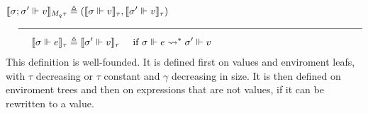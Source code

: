 \begin{definition}
\begin{equation}
\begin{aligned}[c]
  \llbracket \sigma; \sigma' \Vdash v \rrbracket_{M_q \tau} &\triangleq
    (\llbracket \sigma \Vdash v \rrbracket_{\tau}, \llbracket \sigma' \Vdash v
    \rrbracket_{\tau}) \\
  \rule{5em}{0.4pt}&\rule{30em}{0.4pt}\\
  \llbracket \sigma \Vdash e \rrbracket_{\tau} &\triangleq \llbracket \sigma'
    \Vdash v\rrbracket_{\tau} \quad{\text{ if } \sigma \Vdash e
    \rightsquigarrow^* \sigma' \Vdash v}
  \end{aligned}
  \end{equation}
  This definition is well-founded. It is defined first on values and enviroment leafs,
  with $\tau$ decreasing or $\tau$ constant and $\gamma$ decreasing in size. It
  is then defined on enviroment trees and then on expressions that are not
  values, if it can be rewritten to a value.
\end{definition}

